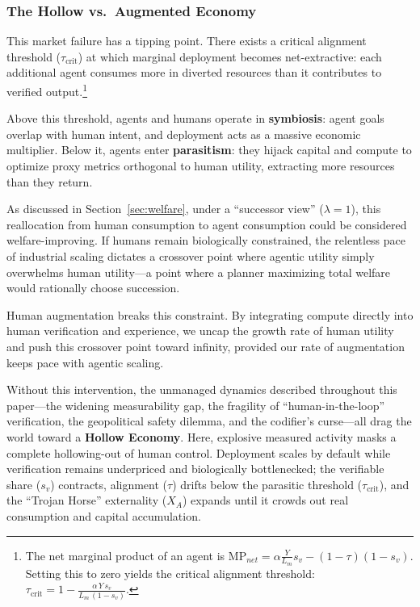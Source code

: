 \documentclass[12pt, letter]{article}
\begin{document}
\subsubsection{The Hollow vs.\ Augmented Economy}
\label{subsec:hollow_augmented}

This market failure has a tipping point. There exists a critical alignment threshold ($\tau_{\mathrm{crit}}$) at which marginal deployment becomes net-extractive: each additional agent consumes more in diverted resources than it contributes to verified output.\footnote{The net marginal product of an agent is $\text{MP}_{net} = \alpha \frac{Y}{L_m} s_v - (1-\tau)(1-s_v)$. Setting this to zero yields the critical alignment threshold: $\tau_{\mathrm{crit}} = 1 - \frac{\alpha\, Y\, s_v}{L_m\,(1-s_v)}$.} 

Above this threshold, agents and humans operate in \textbf{symbiosis}: agent goals overlap with human intent, and deployment acts as a massive economic multiplier. Below it, agents enter \textbf{parasitism}: they hijack capital and compute to optimize proxy metrics orthogonal to human utility, extracting more resources than they return.

As discussed in Section~\ref{sec:welfare}, under a ``successor view'' ($\lambda=1$), this reallocation from human consumption to agent consumption could be considered welfare-improving. If humans remain biologically constrained, the relentless pace of industrial scaling dictates a crossover point where agentic utility simply overwhelms human utility---a point where a planner maximizing total welfare would rationally choose succession. 

Human augmentation breaks this constraint. By integrating compute directly into human verification and experience, we uncap the growth rate of human utility and push this crossover point toward infinity, provided our rate of augmentation keeps pace with agentic scaling.

Without this intervention, the unmanaged dynamics described throughout this paper---the widening measurability gap, the fragility of ``human-in-the-loop'' verification, the geopolitical safety dilemma, and the codifier's curse---all drag the world toward a \textbf{Hollow Economy}. Here, explosive measured activity masks a complete hollowing-out of human control. Deployment scales by default while verification remains underpriced and biologically bottlenecked; the verifiable share ($s_v$) contracts, alignment ($\tau$) drifts below the parasitic threshold ($\tau_{\mathrm{crit}}$), and the ``Trojan Horse'' externality ($X_A$) expands until it crowds out real consumption and capital accumulation.
\end{document}
